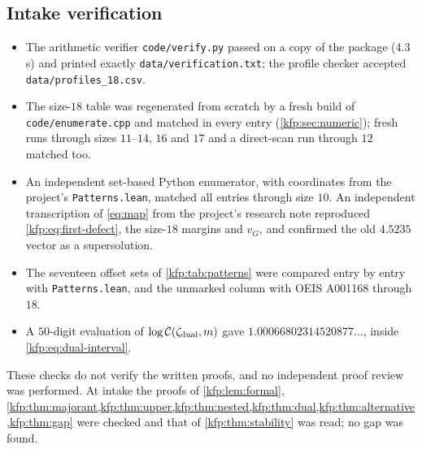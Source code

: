 \documentclass[11pt,a4paper]{article}
\theoremstyle{definition}
\theoremstyle{remark}
\begin{document}
\subsection{Intake verification}
\begin{itemize}
\item The arithmetic verifier \texttt{code/verify.py} passed on a copy of the
 package (4.3\,s) and printed exactly \texttt{data/verification.txt}; the
 profile checker accepted \texttt{data/profiles\_18.csv}.
\item The size-$18$ table was regenerated from scratch by a fresh build of
 \texttt{code/enumerate.cpp} and matched in every entry
 (\cref{kfp:sec:numeric}); fresh runs through sizes $11$--$14$, $16$ and $17$
 and a direct-scan run through $12$ matched too.
\item An independent set-based Python enumerator, with coordinates from the
 project's \texttt{Patterns.lean}, matched all entries through size $10$.
 An independent transcription of \eqref{eq:map} from the project's research
 note \cite{repobound} reproduced \eqref{kfp:eq:first-defect}, the size-$18$
 margins and $v_G$, and confirmed the old $4.5235$ vector as a supersolution.
\item The seventeen offset sets of \cref{kfp:tab:patterns} were compared
 entry by entry with \texttt{Patterns.lean}, and the unmarked column with OEIS
 A001168 through $18$.
\item A $50$-digit evaluation of $\log\mathcal C(\zeta_{\rm dual},m)$ gave
 $1.00066802314520877\ldots$, inside \eqref{kfp:eq:dual-interval}.
\end{itemize}
These checks do not verify the written proofs, and no independent proof review
was performed. At intake the proofs of \cref{kfp:lem:formal},
\cref{kfp:thm:majorant,kfp:thm:upper,kfp:thm:nested,kfp:thm:dual,kfp:thm:alternative,kfp:thm:gap}
were checked and that of \cref{kfp:thm:stability} was read; no gap was found.
\end{document}
